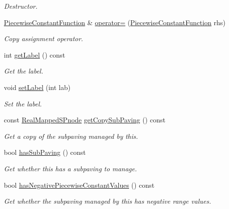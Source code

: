 \begin{DoxyCompactItemize}
\begin{DoxyCompactList}\small\item\em \-Destructor. \end{DoxyCompactList}\item 
\hyperlink{classsubpavings_1_1PiecewiseConstantFunction}{\-Piecewise\-Constant\-Function} \& \hyperlink{classsubpavings_1_1PiecewiseConstantFunction_afb1b70cb3d82858719f489e6cc239115}{operator=} (\hyperlink{classsubpavings_1_1PiecewiseConstantFunction}{\-Piecewise\-Constant\-Function} rhs)
\begin{DoxyCompactList}\small\item\em \-Copy assignment operator. \end{DoxyCompactList}\item 
int \hyperlink{classsubpavings_1_1PiecewiseConstantFunction_a50b455741489ca51374faee1dca38d61}{get\-Label} () const 
\begin{DoxyCompactList}\small\item\em \-Get the label. \end{DoxyCompactList}\item 
void \hyperlink{classsubpavings_1_1PiecewiseConstantFunction_a7b71fbda0321a5272e92f652119f9aa3}{set\-Label} (int lab)
\begin{DoxyCompactList}\small\item\em \-Set the label. \end{DoxyCompactList}\item 
const \hyperlink{classsubpavings_1_1RealMappedSPnode}{\-Real\-Mapped\-S\-Pnode} \hyperlink{classsubpavings_1_1PiecewiseConstantFunction_ad0419b40b47ffa5bb70af1f9cfe86062}{get\-Copy\-Sub\-Paving} () const 
\begin{DoxyCompactList}\small\item\em \-Get a copy of the subpaving managed by this. \end{DoxyCompactList}\item 
bool \hyperlink{classsubpavings_1_1PiecewiseConstantFunction_afecdfb659b961eab7f8d18160bea7296}{has\-Sub\-Paving} () const 
\begin{DoxyCompactList}\small\item\em \-Get whether this has a subpaving to manage. \end{DoxyCompactList}\item 
bool \hyperlink{classsubpavings_1_1PiecewiseConstantFunction_a892d2caaed6213ae262f2a0b1dba27b5}{has\-Negative\-Piecewise\-Constant\-Values} () const 
\begin{DoxyCompactList}\small\item\em \-Get whether the subpaving managed by this has negative range values. \end{DoxyCompactList}\item 

\end{DoxyCompactItemize}
